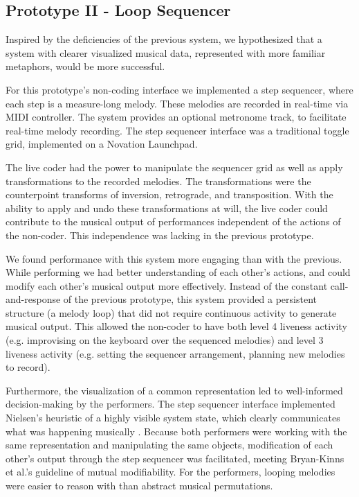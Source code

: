 \documentclass{nime-alternate}
\begin{document}
\subsection{Prototype II - Loop Sequencer}
Inspired by the deficiencies of the previous system, we hypothesized that a system with clearer visualized musical data, represented with more familiar metaphors, would be more successful.

For this prototype's non-coding interface we implemented a step sequencer, where each step is a measure-long melody. These melodies are recorded in real-time via MIDI controller. The system provides an optional metronome track, to facilitate real-time melody recording. The step sequencer interface was a traditional toggle grid, implemented on a Novation Launchpad. 

The live coder had the power to manipulate the sequencer grid as well as apply transformations to the recorded melodies. The transformations were the counterpoint transforms of inversion, retrograde, and transposition. With the ability to apply and undo these transformations at will, the live coder could contribute to the musical output of performances independent of the actions of the non-coder. This independence was lacking in the previous prototype.

We found performance with this system more engaging than with the previous. While performing we had better understanding of each other's actions, and could modify each other's musical output more effectively. Instead of the constant call-and-response of the previous prototype, this system provided a persistent structure (a melody loop) that did not require continuous activity to generate musical output. This allowed the non-coder to have both level 4 liveness activity (e.g. improvising on the keyboard over the sequenced melodies) and level 3 liveness activity (e.g. setting the sequencer arrangement, planning new melodies to record).

Furthermore, the visualization of a common representation led to well-informed decision-making by the performers. The step sequencer interface implemented Nielsen's heuristic of a highly visible system state, which clearly communicates what was happening musically \cite{nielsen_heuristic_1994}. Because both performers were working with the same representation and manipulating the same objects, modification of each other's output through the step sequencer was facilitated, meeting Bryan-Kinns et al.'s guideline of mutual modifiability. For the performers, looping melodies were easier to reason with than abstract musical permutations.
\end{document}

